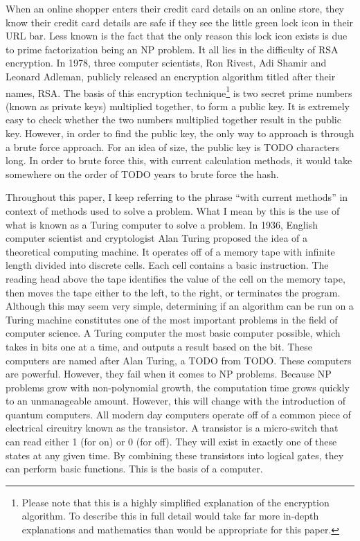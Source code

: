 \documentclass[12pt]{article}
\begin{document}
\begin{flushleft}
When an online shopper enters their credit card details on an online store, they know their credit card details are safe if they see the little green lock icon in their URL bar. Less known is the fact that the only reason this lock icon exists is due to prime factorization being an NP problem. It all lies in the difficulty of RSA encryption. In 1978, three computer scientists, Ron Rivest, Adi Shamir and Leonard Adleman, publicly released an encryption algorithm titled after their names, RSA. The basis of this encryption technique\footnote{Please note that this is a highly simplified explanation of the encryption algorithm. To describe this in full detail would take far more in-depth explanations and mathematics than would be appropriate for this paper.} is two secret prime numbers (known as private keys) multiplied together, to form a public key. It is extremely easy to check whether the two numbers multiplied together result in the public key. However, in order to find the public key, the only way to approach is through a brute force approach. For an idea of size, the public key is TODO characters long. In order to brute force this, with current calculation  methods, it would take somewhere on the order of TODO years to brute force the hash. 


Throughout this paper, I keep referring to the phrase ``with current methods'' in context of methods used to solve a problem. What I mean by this is the use of what is known as a Turing computer to solve a problem. In 1936, English computer scientist and cryptologist Alan Turing proposed the idea of a theoretical computing machine. It operates off of a memory tape with infinite length divided into discrete cells. Each cell contains a basic instruction. The reading head above the tape identifies the value of the cell on the memory tape, then moves the tape either to the left, to the right, or terminates the program. Although this may seem very simple, determining if an algorithm can be run on a Turing machine constitutes one of the most important problems in the field of computer science. A Turing computer the most basic computer possible, which takes in bits one at a time, and outputs a result based on the bit. These computers are named after Alan Turing, a TODO from TODO. These computers are powerful. However, they fail when it comes to NP problems. Because NP problems grow with non-polynomial growth, the computation time grows quickly to an unmanageable amount. However, this will change with the introduction of quantum computers. 
All modern day computers operate off of a common piece of electrical circuitry known as the transistor. A transistor is a micro-switch that can read either 1 (for on) or 0 (for off). They will exist in exactly one of these states at any given time. By combining these transistors into logical gates, they can perform basic functions. This is the basis of a computer. 


\end{flushleft}
\end{document}
